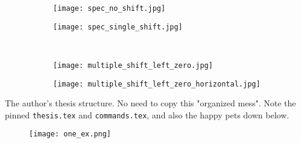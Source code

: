 \documentclass[../thesis.tex]{subfiles}
\begin{document}
\begin{figure}[h!]%
    \centering
    \begin{subfigure}{.45\textwidth}
        \texttt{[image: spec\_no\_shift.jpg]}
    \end{subfigure}\quad
    \begin{subfigure}{.45\textwidth}
        \texttt{[image: spec\_single\_shift.jpg]}
    \end{subfigure}\\
    \begin{subfigure}{.45\textwidth}
        \texttt{[image: multiple\_shift\_left\_zero.jpg]}
    \end{subfigure}\quad
    \begin{subfigure}{.45\textwidth}
        \texttt{[image: multiple\_shift\_left\_zero\_horizontal.jpg]}
    \end{subfigure}
\end{figure}



\clearpage
The author's thesis structure. No need to copy this "organized mess". Note the pinned \verb|thesis.tex| and \verb|commands.tex|, and also the happy pets down below. 
\begin{figure}[h!]
    \centering
    \texttt{[image: one\_ex.png]}
\end{figure}
\end{document}
